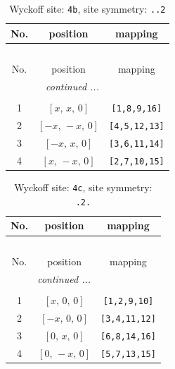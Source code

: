 \documentclass[fleqn,8pt]{jsarticle}
\begin{document}
\begin{longtable}{ccc}
\caption{Wyckoff site: {\tt 4b}, site symmetry: {\tt ..2}}
 \\
 \hline \hline
No. & position & mapping \\ \hline \endfirsthead

\multicolumn{2}{l}{\tablename\ \thetable{}} \\
 \hline \hline
No. & position & mapping \\ \hline \endhead

 \hline \hline
\multicolumn{2}{r}{\footnotesize\it continued ...} \\ \endfoot

 \hline \hline
\multicolumn{2}{r}{} \\ \endlastfoot

1 & $\left[ x,\, x,\, 0 \right]$ & {\tt [1,8,9,16]} \\ \hline
2 & $\left[ - x,\, - x,\, 0 \right]$ & {\tt [4,5,12,13]} \\ \hline
3 & $\left[ - x,\, x,\, 0 \right]$ & {\tt [3,6,11,14]} \\ \hline
4 & $\left[ x,\, - x,\, 0 \right]$ & {\tt [2,7,10,15]} \\
\end{longtable}
\renewcommand{\arraystretch}{1.2}
\begin{longtable}{ccc}
\caption{Wyckoff site: {\tt 4c}, site symmetry: {\tt .2.}}
 \\
 \hline \hline
No. & position & mapping \\ \hline \endfirsthead

\multicolumn{2}{l}{\tablename\ \thetable{}} \\
 \hline \hline
No. & position & mapping \\ \hline \endhead

 \hline \hline
\multicolumn{2}{r}{\footnotesize\it continued ...} \\ \endfoot

 \hline \hline
\multicolumn{2}{r}{} \\ \endlastfoot

1 & $\left[ x,\, 0,\, 0 \right]$ & {\tt [1,2,9,10]} \\ \hline
2 & $\left[ - x,\, 0,\, 0 \right]$ & {\tt [3,4,11,12]} \\ \hline
3 & $\left[ 0,\, x,\, 0 \right]$ & {\tt [6,8,14,16]} \\ \hline
4 & $\left[ 0,\, - x,\, 0 \right]$ & {\tt [5,7,13,15]} \\
\end{longtable}
\end{document}
